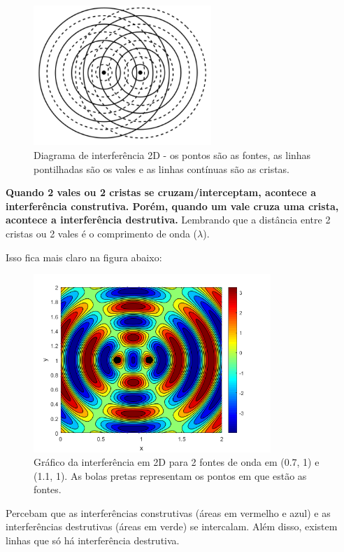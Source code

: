\documentclass[12pt]{extarticle}
\newcommand{\<}{\langle}
\renewcommand{\>}{\rangle}
\theoremstyle{definition}
\begin{document}
\begin{figure}[H]
    \centering
    \includegraphics[width=0.6\textwidth]{interferencia_2d.png}
    \caption{Diagrama de interferência 2D - os pontos são as fontes, as linhas pontilhadas são os vales e as linhas contínuas são as cristas.}
    \label{fig:interferencia_2d}
\end{figure}
\textbf{Quando 2 vales ou 2 cristas se cruzam/interceptam, acontece a interferência construtiva. Porém, quando um vale cruza uma crista, acontece a interferência destrutiva.} Lembrando que a distância entre 2 cristas ou 2 vales é o comprimento de onda ($\lambda$).

Isso fica mais claro na figura abaixo:
\begin{figure}[H]
    \centering
    \includegraphics[width=0.8\textwidth]{interferencia_2d_color.png}
    \caption{Gráfico da interferência em 2D para 2 fontes de onda em (0.7, 1) e (1.1, 1). As bolas pretas representam os pontos em que estão as fontes.}
    \label{fig:2d_matlab}
\end{figure}
Percebam que as interferências construtivas (áreas em vermelho e azul) e as interferências destrutivas (áreas em verde) se intercalam. Além disso, existem linhas que só há interferência destrutiva. 
\end{document}
